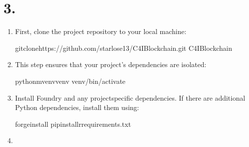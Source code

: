\documentclass[letterpaper,10pt,english]{sphinxmanual}
\begin{document}
\section{3. }
\label{\detokenize{quickstart:setting-up-your-environment}}\label{\detokenize{quickstart:setting-up-environment}}\begin{enumerate}
%
\item {} 
\sphinxAtStartPar
{}

\sphinxAtStartPar
First, clone the project repository to your local machine:

\begin{sphinxVerbatim}[commandchars=\\\{\}]
gitclonehttps://github.com/starlose13/C4I\PYGZhy{}Blockchain.git
C4I\PYGZhy{}Blockchain
\end{sphinxVerbatim}

\item {} 
\sphinxAtStartPar
{}

\sphinxAtStartPar
This step ensures that your project’s dependencies are isolated:

\begin{sphinxVerbatim}[commandchars=\\\{\}]
python\PYGZhy{}mvenvvenv
venv/bin/activate
\end{sphinxVerbatim}

\item {} 
\sphinxAtStartPar
{}

\sphinxAtStartPar
Install Foundry and any project\sphinxhyphen{}specific dependencies. If there are additional Python dependencies, install them using:

\begin{sphinxVerbatim}[commandchars=\\\{\}]
forgeinstall
pipinstall\PYGZhy{}rrequirements.txt
\end{sphinxVerbatim}

\item {} 
\sphinxAtStartPar
{}


\end{enumerate}
\end{document}
